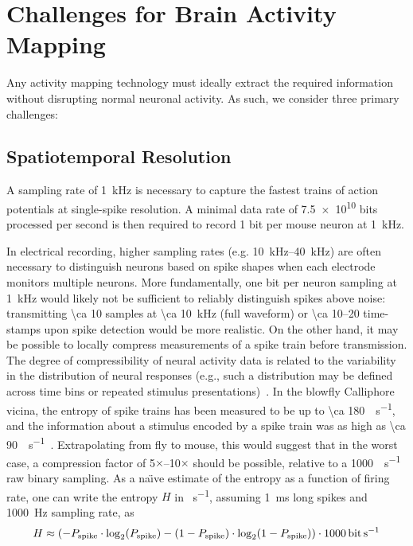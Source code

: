 \section{Challenges for Brain Activity Mapping}
\label{sec:challenges}
Any activity mapping technology must ideally extract the required information without disrupting normal neuronal activity.
As such, we consider three primary challenges:

\subsection{Spatiotemporal Resolution}

A sampling rate of \SI{1}{\kilo\hertz} is necessary to capture the fastest trains of action potentials at single-spike resolution.
A minimal data rate of \num{7.5e10} bits processed per second is then required to record 1 bit per mouse neuron at \SI{1}{\kilo\hertz}.

In electrical recording, higher sampling rates (e.g. \SIrange{10}{40}{\kilo\hertz}) are often necessary to distinguish neurons based on spike shapes when each electrode monitors multiple neurons.
More fundamentally, one bit per neuron sampling at \SI{1}{\kilo\hertz} would likely not be sufficient to reliably distinguish spikes above noise: transmitting \SI{\ca 10}{\bit} samples at \SI{\ca 10}{\kilo\hertz} (full waveform) or \SIrange{\ca 10}{20}{\bit} time-stamps upon spike detection would be more realistic.
On the other hand, it may be possible to locally compress measurements of a spike train before transmission.
The degree of compressibility of neural activity data is related to the variability in the distribution of neural responses (e.g., such a distribution may be defined across time bins or repeated stimulus presentations)~\cite{strong98}.
In the blowfly Calliphore vicina, the entropy of spike trains has been measured to be up to \SI{\ca 180}{\bit\per\second}, and the information about a stimulus encoded by a spike train was as high as \SI{\ca 90}{\bit\per\second}~\cite{strong98}. Extrapolating from fly to mouse, this would suggest that in the worst case, a compression factor of 5$\times$--10$\times$ should be possible, relative to a \SI{1000}{\bit\per\second} raw binary sampling. As a na\"{\i}ve estimate of the entropy as a function of firing rate, one can write the entropy $H$ in \si{\bit\per\second}, assuming \SI{1}{\milli\second} long spikes and \SI{1000}{\hertz} sampling rate, as
\[H \approx \left(-P\sub{spike}\cdot\log_2\!\left(P\sub{spike}\right) - \left(1 - P\sub{spike}\right)\cdot\log_2\!\left(1 - P\sub{spike}\right)\right) \cdot \SI{1000}{\bit\per\second}\]

